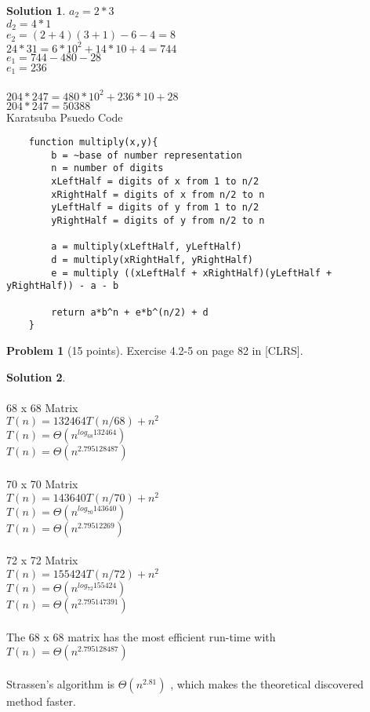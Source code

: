 \documentclass{article}
\theoremstyle{definition}
\newtheorem{problem}{Problem}
\newtheorem*{solution}{Solution}
\begin{document}
\begin{solution}
\indent    $a_2 = 2 * 3 $\\
\indent     $d_2 = 4 * 1$\\
 \indent    $e_2 = (2 + 4)(3 + 1) - 6 - 4 = 8$\\
\indent     $24*31 = 6*10^2 + 14*10 + 4 = 744 $\\
$e_1 = 744 - 480 - 28$\\
$e_1 = 236$\\
\\
$204*247 = 480*10^2 + 236 *10 + 28$\\
$204*247=50388$
\\
\newpage
Karatsuba Psuedo Code
\begin{verbatim}
    function multiply(x,y){
        b = ~base of number representation
        n = number of digits
        xLeftHalf = digits of x from 1 to n/2
        xRightHalf = digits of x from n/2 to n
        yLeftHalf = digits of y from 1 to n/2
        yRightHalf = digits of y from n/2 to n
        
        a = multiply(xLeftHalf, yLeftHalf)
        d = multiply(xRightHalf, yRightHalf)
        e = multiply ((xLeftHalf + xRightHalf)(yLeftHalf + yRightHalf)) - a - b
        
        return a*b^n + e*b^(n/2) + d
    }
\end{verbatim}


\end{solution}

\newpage

\begin{problem}[15 points]
Exercise 4.2-5 on page 82 in [CLRS]. 
\end{problem}
\begin{solution} \\
\\
68 x 68 Matrix \\
$T(n) = 132464T(n/68)+n^2$\\
$T(n) = \Theta (n^{log_{68}{132464}})$\\
$T(n) = \Theta (n^{2.795128487})$\\
\\
70 x 70 Matrix \\
$T(n) = 143640T(n/70)+n^2$\\
$T(n) = \Theta (n^{log_{70}{143640}})$\\
$T(n) = \Theta (n^{2.79512269})$\\
\\
72 x 72 Matrix \\
$T(n) = 155424T(n/72)+n^2$\\
$T(n) = \Theta (n^{log_{72}{155424}})$\\
$T(n) = \Theta (n^{2.795147391})$\\
\\
The 68 x 68 matrix has the most efficient run-time with $T(n) = \Theta (n^{2.795128487})$\\
\\
Strassen's algorithm is $\Theta(n^{2.81})$ , which makes the theoretical discovered method faster.
\end{solution}
\end{document}
